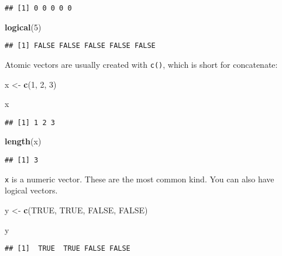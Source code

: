 \documentclass[
]{book}
\newenvironment{Shaded}{\begin{snugshade}}{\end{snugshade}}
\newcommand{\DecValTok}[1]{\textcolor[rgb]{0.00,0.00,0.81}{#1}}
\newcommand{\KeywordTok}[1]{\textcolor[rgb]{0.13,0.29,0.53}{\textbf{#1}}}
\newcommand{\NormalTok}[1]{#1}
\newcommand{\OtherTok}[1]{\textcolor[rgb]{0.56,0.35,0.01}{#1}}
\newcommand{\StringTok}[1]{\textcolor[rgb]{0.31,0.60,0.02}{#1}}
\begin{document}
\begin{verbatim}
## [1] 0 0 0 0 0
\end{verbatim}

\begin{Shaded}
\begin{Highlighting}[]
\KeywordTok{logical}\NormalTok{(}\DecValTok{5}\NormalTok{)}
\end{Highlighting}
\end{Shaded}

\begin{verbatim}
## [1] FALSE FALSE FALSE FALSE FALSE
\end{verbatim}

Atomic vectors are usually created with \texttt{c()}, which is short for concatenate:

\begin{Shaded}
\begin{Highlighting}[]
\NormalTok{x \textless{}{-}}\StringTok{ }\KeywordTok{c}\NormalTok{(}\DecValTok{1}\NormalTok{, }\DecValTok{2}\NormalTok{, }\DecValTok{3}\NormalTok{)}

\NormalTok{x}
\end{Highlighting}
\end{Shaded}

\begin{verbatim}
## [1] 1 2 3
\end{verbatim}

\begin{Shaded}
\begin{Highlighting}[]
\KeywordTok{length}\NormalTok{(x)}
\end{Highlighting}
\end{Shaded}

\begin{verbatim}
## [1] 3
\end{verbatim}

\texttt{x} is a numeric vector. These are the most common kind. You can also have logical vectors.

\begin{Shaded}
\begin{Highlighting}[]
\NormalTok{y \textless{}{-}}\StringTok{ }\KeywordTok{c}\NormalTok{(}\OtherTok{TRUE}\NormalTok{, }\OtherTok{TRUE}\NormalTok{, }\OtherTok{FALSE}\NormalTok{, }\OtherTok{FALSE}\NormalTok{)}

\NormalTok{y}
\end{Highlighting}
\end{Shaded}

\begin{verbatim}
## [1]  TRUE  TRUE FALSE FALSE
\end{verbatim}
\end{document}
